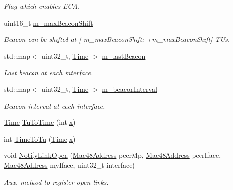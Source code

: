 \begin{DoxyCompactItemize}
\begin{DoxyCompactList}\small\item\em Flag which enables B\+CA. \end{DoxyCompactList}\item 
uint16\+\_\+t \hyperlink{classns3_1_1dot11s_1_1PeerManagementProtocol_a23968eb845fa63fe87f303d2e21e77f0}{m\+\_\+max\+Beacon\+Shift}
\begin{DoxyCompactList}\small\item\em Beacon can be shifted at \mbox{[}-\/m\+\_\+max\+Beacon\+Shift; +m\+\_\+max\+Beacon\+Shift\mbox{]} T\+Us. \end{DoxyCompactList}\item 
std\+::map$<$ uint32\+\_\+t, \hyperlink{classns3_1_1Time}{Time} $>$ \hyperlink{classns3_1_1dot11s_1_1PeerManagementProtocol_a8d3adf393b3f4d96d60285132b1004da}{m\+\_\+last\+Beacon}
\begin{DoxyCompactList}\small\item\em Last beacon at each interface. \end{DoxyCompactList}\item 
std\+::map$<$ uint32\+\_\+t, \hyperlink{classns3_1_1Time}{Time} $>$ \hyperlink{classns3_1_1dot11s_1_1PeerManagementProtocol_a915ce7d45ccdfa57b75bc300745974fa}{m\+\_\+beacon\+Interval}
\begin{DoxyCompactList}\small\item\em Beacon interval at each interface. \end{DoxyCompactList}\item 
\hyperlink{classns3_1_1Time}{Time} \hyperlink{classns3_1_1dot11s_1_1PeerManagementProtocol_adcc7f057f6fa22012b3ee72cf57e2082}{Tu\+To\+Time} (int \hyperlink{lte__link__budget__x2__handover__measures_8m_a9336ebf25087d91c818ee6e9ec29f8c1}{x})
\item 
int \hyperlink{classns3_1_1dot11s_1_1PeerManagementProtocol_a1e38bb4ee6161f0015dd60113a4a0acd}{Time\+To\+Tu} (\hyperlink{classns3_1_1Time}{Time} \hyperlink{lte__link__budget__x2__handover__measures_8m_a9336ebf25087d91c818ee6e9ec29f8c1}{x})
\item 
void \hyperlink{classns3_1_1dot11s_1_1PeerManagementProtocol_ae07e386558214bde98e6ea0b57f6ee79}{Notify\+Link\+Open} (\hyperlink{classns3_1_1Mac48Address}{Mac48\+Address} peer\+Mp, \hyperlink{classns3_1_1Mac48Address}{Mac48\+Address} peer\+Iface, \hyperlink{classns3_1_1Mac48Address}{Mac48\+Address} my\+Iface, uint32\+\_\+t interface)
\begin{DoxyCompactList}\small\item\em Aux. method to register open links. \end{DoxyCompactList}\item 

\end{DoxyCompactItemize}
